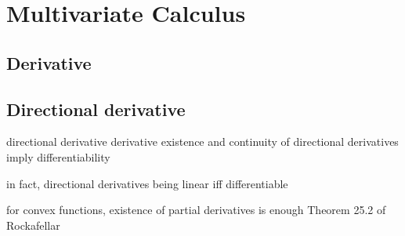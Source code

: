 \chapter{Multivariate Calculus}

\section{Derivative}
\label{sec:derivative}

\section{Directional derivative}
\label{sec:directional_derivative}

directional derivative
derivative
existence and continuity of directional derivatives imply differentiability
 
in fact, directional derivatives being linear iff differentiable

for convex functions, existence of partial derivatives is enough
Theorem 25.2 of Rockafellar